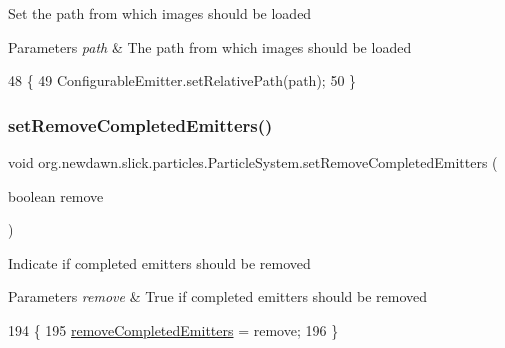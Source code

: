 Set the path from which images should be loaded


\begin{DoxyParams}{Parameters}
{\em path} & The path from which images should be loaded \\
\hline
\end{DoxyParams}

\begin{DoxyCode}
48                                                     \{
49         ConfigurableEmitter.setRelativePath(path);
50     \}
\end{DoxyCode}
\mbox{\label{classorg_1_1newdawn_1_1slick_1_1particles_1_1_particle_system_af471c877884c73411ed37a28755b62b0}} 
\subsubsection{\texorpdfstring{set\+Remove\+Completed\+Emitters()}{setRemoveCompletedEmitters()}}
{\footnotesize\ttfamily void org.\+newdawn.\+slick.\+particles.\+Particle\+System.\+set\+Remove\+Completed\+Emitters (\begin{DoxyParamCaption}\item[{boolean}]{remove }\end{DoxyParamCaption})\hspace{0.3cm}{\ttfamily [inline]}}

Indicate if completed emitters should be removed


\begin{DoxyParams}{Parameters}
{\em remove} & True if completed emitters should be removed \\
\hline
\end{DoxyParams}

\begin{DoxyCode}
194                                                            \{
195         \mbox{\hyperlink{classorg_1_1newdawn_1_1slick_1_1particles_1_1_particle_system_aef5bd9da423c6e554d0ea54d1df329c9}{removeCompletedEmitters}} = \textcolor{keyword}{remove};
196     \}
\end{DoxyCode}
\mbox{\label{classorg_1_1newdawn_1_1slick_1_1particles_1_1_particle_system_aa4c13ea337e97c887ba377724615e374}} 
